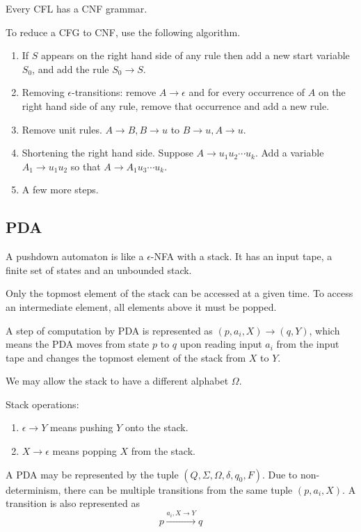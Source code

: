 \documentclass{article}
\begin{document}
Every CFL has a CNF grammar.

To reduce a CFG to CNF, use the following algorithm.

\begin{enumerate}
\item\label{item:34} If $S$ appears on the right hand side of any rule then add a new start variable $S_0$, and add the rule $S_0 \to S$. 
\item\label{item:35} Removing $\epsilon$-transitions: remove $A \to \epsilon$ and for every occurrence of $A$ on the right hand side of any rule, remove that occurrence and add a new rule. 
\item\label{item:36} Remove unit rules. $A\to B, B \to u$ to $B \to u, A \to u$. 
\item\label{item:37} Shortening the right hand side. Suppose $A \to u_1u_2\cdots u_k$. Add a variable $A_1 \to u_1u_2$ so that $A \to A_1u_3\cdots u_k$. 
\item\label{item:38} A few more steps.
\end{enumerate}

\subsection{PDA}

A pushdown automaton is like a $\epsilon$-NFA with a stack. It has an input tape, a finite set of states and an unbounded stack.

Only the topmost element of the stack can be accessed at a given time. To access an intermediate element, all elements above it must be popped.

A step of computation by PDA is represented as $(p, a_i, X) \to (q, Y)$, which means the PDA moves from state $p$ to $q$ upon reading input $a_i$ from the input tape and changes the topmost element of the stack from $X$ to $Y$.

We may allow the stack to have a different alphabet $\Omega$.

Stack operations: 
\begin{enumerate}
\item\label{item:39} $\epsilon \to Y$ means pushing $Y$ onto the stack. 
\item\label{item:40} $X \to \epsilon$ means popping $X$ from the stack.
\end{enumerate} 

A PDA may be represented by the tuple $(Q, \Sigma, \Omega, \delta, q_0, F)$. Due to non-determinism, there can be multiple transitions from the same tuple $(p, a_i, X)$. A transition is also represented as 
\begin{displaymath}
p \xrightarrow{a_i, X\to Y} q 
\end{displaymath}
\end{document}
